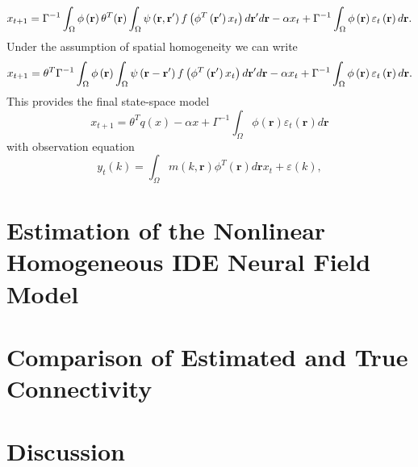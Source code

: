 \documentclass[onecolumn,draftcls]{IEEEtran}
\begin{document}
\begin{equation}\label{SS Model}
{x_{t+1}} = {\Gamma ^{ - 1}}\int_\Omega  {\phi \left( {\bf{r}} \right)\theta^T(\mathbf{r})\int_\Omega  {\psi \left( {{\bf{r}} , {\bf{r'}}} \right)f\left( {{\phi ^T}\left( {{\bf{r'}}} \right){x_t}} \right)d{\bf{r'}}} d{\bf{r}}}-\alpha x_t + {\Gamma ^{ - 1}}\int_\Omega  {\phi \left( {\bf{r}} \right){\varepsilon _t}\left( {\bf{r}} \right)d{\bf{r}}}.
\end{equation}
Under the assumption of spatial homogeneity we can write
\begin{equation}\label{Homogeneous SS Model}
{x_{t+1}} = \theta^T{\Gamma ^{ - 1}}\int_\Omega  {\phi \left( {\bf{r}} \right)\int_\Omega  {\psi \left( {{\bf{r}} - {\bf{r'}}} \right)f\left( {{\phi ^T}\left( {{\bf{r'}}} \right){x_t}} \right)d{\bf{r'}}} d{\bf{r}}}-\alpha x_t + {\Gamma ^{ - 1}}\int_\Omega  {\phi \left( {\bf{r}} \right){\varepsilon _t}\left( {\bf{r}} \right)d{\bf{r}}}.
\end{equation}
This provides the final state-space model
\begin{equation}\label{AbbrevSSModel}
x_{t + 1} = \theta^T q(x) -\alpha x + \Gamma ^{ - 1}\int_\Omega  {\phi ( \mathbf{r} ){\varepsilon _t}( \mathbf{r} )d\mathbf{r}}
\end{equation}
with observation equation
\begin{equation}\label{ObservationEquation}
    y_t( k ) = \int_\Omega  m( k,\mathbf{r} )\phi^T( \mathbf{r} ) d\mathbf{r}x_t  + \varepsilon ( k ),
\end{equation}

\section{Estimation of the Nonlinear Homogeneous IDE Neural Field Model}


\section{Comparison of Estimated and True Connectivity}

\section{Discussion}
\end{document}

